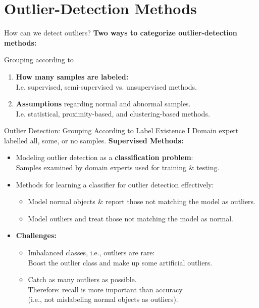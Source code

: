 \section{Outlier-Detection Methods}

\begin{frame}{How can we detect outliers?}
	\textbf{Two ways to categorize outlier-detection methods:}

	Grouping according to
	\begin{enumerate}
		\item \textcolor{faugray}{\textbf{How many samples are labeled:}}\\
		      I.e. supervised, semi-supervised vs. unsupervised methods.
		\item \textcolor{faugray}{\textbf{Assumptions}} regarding normal and abnormal samples.\\
		      I.e. statistical, proximity-based, and clustering-based methods.
	\end{enumerate}
\end{frame}


\begin{frame}{Outlier Detection: Grouping According to Label Existence I}
	Domain expert labelled all, some, or no samples.
	\vspace*{1em}
	\textcolor{faugray}{\textbf{Supervised Methods:}}
	\begin{itemize}
		\item Modeling outlier detection as a \textbf{classification problem}:\\
		      Samples examined by domain experts used for training \& testing.
		\item Methods for learning a classifier for outlier detection effectively:
		      \begin{itemize}
			      \item Model normal objects \& report those not matching the model as outliers.
			      \item Model outliers and treat those not matching the model as normal.
		      \end{itemize}
		\item \textbf{Challenges:}
		      \begin{itemize}
			      \item Imbalanced classes, i.e., outliers are rare: \\
			            Boost the outlier class and make up some artificial outliers.
			      \item Catch as many outliers as possible. \\
			            Therefore: recall is more important than accuracy \\
			            (i.e., not mislabeling normal objects as outliers).
		      \end{itemize}
	\end{itemize}
\end{frame}


